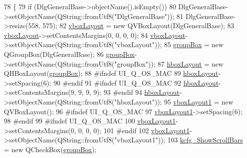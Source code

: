 \begin{DoxyCode}
78     \{
79         \textcolor{keywordflow}{if} (DlgGeneralBase->objectName().isEmpty())
80             DlgGeneralBase->setObjectName(QString::fromUtf8(\textcolor{stringliteral}{"DlgGeneralBase"}));
81         DlgGeneralBase->resize(558, 575);
82         \hyperlink{classUi__DlgGeneralBase_ad85268c43c0919c56230704be03f092c}{vboxLayout} = \textcolor{keyword}{new} QVBoxLayout(DlgGeneralBase);
83         \hyperlink{classUi__DlgGeneralBase_ad85268c43c0919c56230704be03f092c}{vboxLayout}->setContentsMargins(0, 0, 0, 0);
84         \hyperlink{classUi__DlgGeneralBase_ad85268c43c0919c56230704be03f092c}{vboxLayout}->setObjectName(QString::fromUtf8(\textcolor{stringliteral}{"vboxLayout"}));
85         \hyperlink{classUi__DlgGeneralBase_aa25408255cc1bc3b6d720b58ceb42e32}{groupBox} = \textcolor{keyword}{new} QGroupBox(DlgGeneralBase);
86         \hyperlink{classUi__DlgGeneralBase_aa25408255cc1bc3b6d720b58ceb42e32}{groupBox}->setObjectName(QString::fromUtf8(\textcolor{stringliteral}{"groupBox"}));
87         \hyperlink{classUi__DlgGeneralBase_a43bdd775726703c8af00b360880cd7a9}{hboxLayout} = \textcolor{keyword}{new} QHBoxLayout(\hyperlink{classUi__DlgGeneralBase_aa25408255cc1bc3b6d720b58ceb42e32}{groupBox});
88 \textcolor{preprocessor}{#ifndef UI\_Q\_OS\_MAC}
89         \hyperlink{classUi__DlgGeneralBase_a43bdd775726703c8af00b360880cd7a9}{hboxLayout}->setSpacing(6);
90 \textcolor{preprocessor}{#endif}
91 \textcolor{preprocessor}{#ifndef UI\_Q\_OS\_MAC}
92         \hyperlink{classUi__DlgGeneralBase_a43bdd775726703c8af00b360880cd7a9}{hboxLayout}->setContentsMargins(9, 9, 9, 9);
93 \textcolor{preprocessor}{#endif}
94         \hyperlink{classUi__DlgGeneralBase_a43bdd775726703c8af00b360880cd7a9}{hboxLayout}->setObjectName(QString::fromUtf8(\textcolor{stringliteral}{"hboxLayout"}));
95         \hyperlink{classUi__DlgGeneralBase_ada5c5c425bafcc272b9562c93ed886e8}{vboxLayout1} = \textcolor{keyword}{new} QVBoxLayout();
96 \textcolor{preprocessor}{#ifndef UI\_Q\_OS\_MAC}
97         \hyperlink{classUi__DlgGeneralBase_ada5c5c425bafcc272b9562c93ed886e8}{vboxLayout1}->setSpacing(6);
98 \textcolor{preprocessor}{#endif}
99 \textcolor{preprocessor}{#ifndef UI\_Q\_OS\_MAC}
100         \hyperlink{classUi__DlgGeneralBase_ada5c5c425bafcc272b9562c93ed886e8}{vboxLayout1}->setContentsMargins(0, 0, 0, 0);
101 \textcolor{preprocessor}{#endif}
102         \hyperlink{classUi__DlgGeneralBase_ada5c5c425bafcc272b9562c93ed886e8}{vboxLayout1}->setObjectName(QString::fromUtf8(\textcolor{stringliteral}{"vboxLayout1"}));
103         \hyperlink{classUi__DlgGeneralBase_a58a8f3825a9f66542cd2e6e7e6e66ee9}{kcfg\_ShowScrollBars} = \textcolor{keyword}{new} QCheckBox(\hyperlink{classUi__DlgGeneralBase_aa25408255cc1bc3b6d720b58ceb42e32}{groupBox});

\end{DoxyCode}
